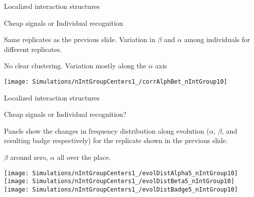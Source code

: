 \documentclass[
  ignorenonframetext,
]{beamer}
\begin{document}
\begin{frame}{Localized interaction structures}
\protect\hypertarget{localized-interaction-structures-4}{}

\begin{block}{Cheap signals or Individual recognition}

\small

Same replicates as the previous slide. Variation in \(\beta\) and
\(\alpha\) among individuals for different replicates.

No clear clustering. Variation mostly along the \(\alpha\) axis

\begin{center}\texttt{[image: Simulations/nIntGroupCenters1\_/corrAlphBet\_nIntGroup10]} \end{center}

\end{block}

\end{frame}

\begin{frame}{Localized interaction structures}
\protect\hypertarget{localized-interaction-structures-5}{}

\begin{block}{Cheap signals or Individual recognition?}

\small

Panels show the changes in frequency distribution along evolution
(\(\alpha\), \(\beta\), and resulting badge respectively) for the
replicate shown in the previous slide.

\(\beta\) around zero, \(\alpha\) all over the place.

\begin{flushleft}\texttt{[image: Simulations/nIntGroupCenters1\_/evolDistAlpha5\_nIntGroup10]} \texttt{[image: Simulations/nIntGroupCenters1\_/evolDistBeta5\_nIntGroup10]} \texttt{[image: Simulations/nIntGroupCenters1\_/evolDistBadge5\_nIntGroup10]} \end{flushleft}

\end{block}

\end{frame}
\end{document}
